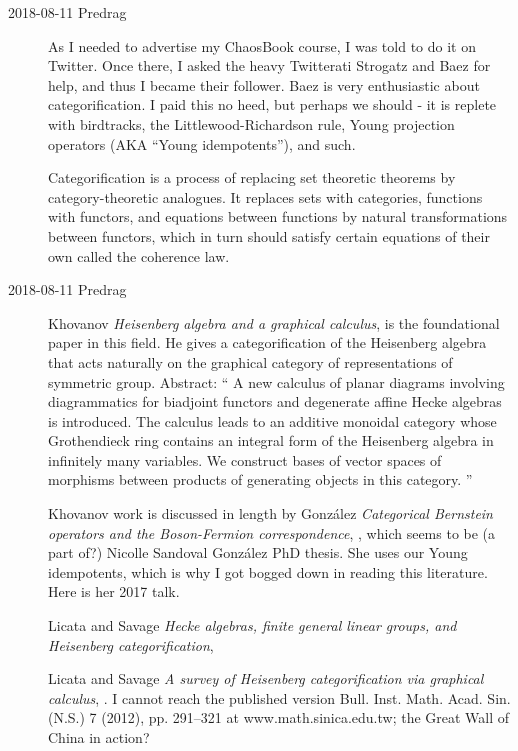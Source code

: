 \begin{description}

\item[2018-08-11 Predrag]
As I needed to advertise my
 {ChaosBook} course, I was
told to do it on Twitter. Once there, I asked the heavy Twitterati
Strogatz and  {Baez} for help,
and thus I became their follower. Baez is very enthusiastic about
categorification. I paid this no heed, but perhaps we should - it is
replete with birdtracks, the Littlewood-Richardson rule, Young projection
operators (AKA ``Young idempotents''), and such.

Categorification is a process of replacing set theoretic
theorems by category-theoretic analogues. It replaces sets with
categories, functions with functors, and equations between functions by
natural transformations between functors, which in turn should satisfy
certain equations of their own called the coherence law.

\item[2018-08-11 Predrag]
Khovanov {\em Heisenberg algebra and a graphical calculus},
 is the foundational paper in this field.
He gives a categorification of the Heisenberg algebra that acts naturally
on the graphical category of representations  of  symmetric  group.
Abstract: ``
A new calculus of planar diagrams involving diagrammatics for biadjoint
functors and degenerate affine Hecke algebras is introduced. The calculus
leads to an additive monoidal category whose Grothendieck ring contains
an integral form of the Heisenberg algebra in infinitely many variables.
We construct bases of vector spaces of morphisms between products of
generating objects in this category.
''

Khovanov work is discussed in length by
Gonz{\'a}lez {\em Categorical {Bernstein} operators and the
{Boson-Fermion} correspondence}, ,
which seems to be (a part of?)
{Nicolle Sandoval Gonz{\'a}lez} PhD thesis. She uses our Young idempotents,
which is why I got bogged down in reading this literature. Here is her
 {2017 talk}.

Licata and Savage {\em Hecke algebras, finite general linear
groups, and {Heisenberg } categorification}, 

Licata and Savage {\em A survey of {Heisenberg}
categorification via graphical calculus},
. I cannot reach the published version
Bull. Inst. Math. Acad. Sin. (N.S.) 7 (2012), pp. 291--321
at  {www.math.sinica.edu.tw};
the Great Wall of China in action?


\end{description}
